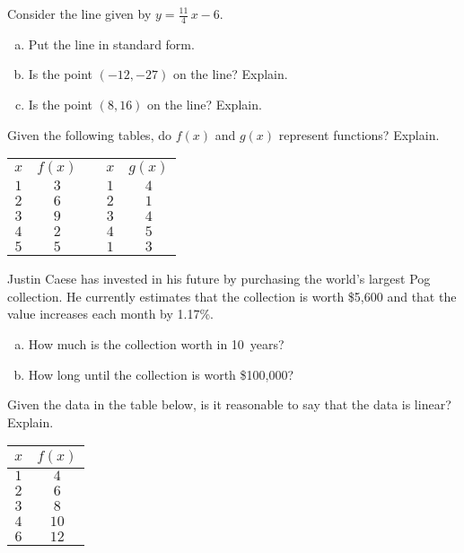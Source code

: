 \documentclass[11pt,letterpaper]{article}
\begin{document}
\prob Consider the line given by $y= \frac{11}{4}\,x - 6$.
        \begin{enumerate}[(a)]
        \item Put the line in standard form.
        \item Is the point $(-12, -27)$ on the line? Explain.
        \item Is the point $(8, 16)$ on the line? Explain. 
        \end{enumerate}  \pspace


\prob Given the following tables, do $f(x)$ and $g(x)$ represent functions? Explain. 
	\begin{table}[!ht]
	\centering \setlength\arrayrulewidth{0.02cm}
	\begin{tabular}{c|ccc|c} 
	$x$ & $f(x)$ & \hspace{2cm} & $x$ & $g(x)$ \\ \cline{1-2} \cline{4-5}
	$1$ & $3$ && $1$ & $4$ \\
	$2$ & $6$ && $2$ & $1$ \\
	$3$ & $9$ && $3$ & $4$ \\
	$4$ & $2$ && $4$ & $5$ \\
	$5$ & $5$ && $1$ & $3$  
	\end{tabular}
	\end{table} \pspace


\prob Justin Caese has invested in his future by purchasing the world's largest Pog collection. He currently estimates that the collection is worth \$5,600 and that the value increases each month by 1.17\%.
	\begin{enumerate}[(a)]
	\item How much is the collection worth in 10~years?
	\item How long until the collection is worth \$100,000?
	\end{enumerate} \pspace


\prob Given the data in the table below, is it reasonable to say that the data is linear? Explain. 
	\begin{table}[!ht]
	\centering
	\begin{tabular}{c|c}
	$x$ & $f(x)$ \\ \hline
	$1$ & $4$ \\
	$2$ & $6$ \\
	$3$ & $8$ \\
	$4$ & $10$ \\
	$6$ & $12$ 
	\end{tabular}
	\end{table} \pspace
\end{document}
